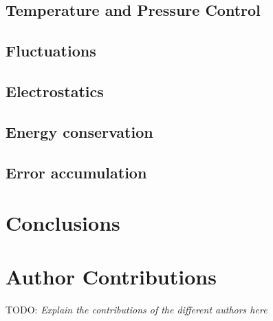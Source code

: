 \documentclass[9pt,bestpractices]{livecoms}
\newcommand{\todo}[1]{{\color{blue}TODO: \emph{#1}}}
\begin{document}
\subsection{Temperature and Pressure Control}
\label{sec:tests.temp-press-control}


\subsection{Fluctuations}
\label{sec:tests.fluctuations}


\subsection{Electrostatics}
\label{sec:tests.electrostatics}


\subsection{Energy conservation}
\label{sec:tests.energy-conservation}


\subsection{Error accumulation}
\label{sec:tests.error-accumulation}



\section{Conclusions}
\label{sec:conclusions}



\section{Author Contributions}
%

\todo{Explain the contributions of the different authors here}
\end{document}
